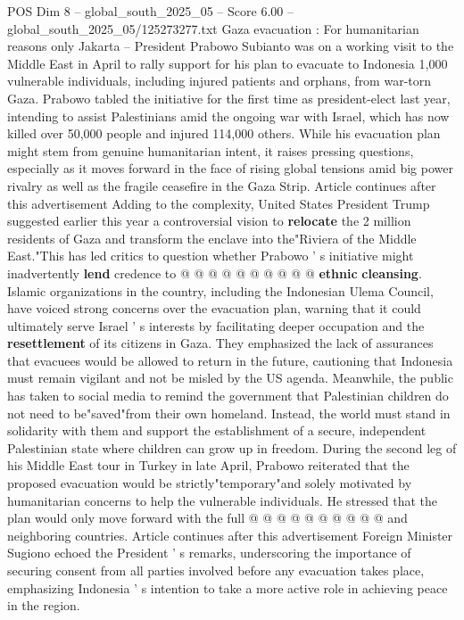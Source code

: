 \begin{textsample}{POS Dim 8 – global\_south\_2025\_05 – Score 6.00 – global\_south\_2025\_05/125273277.txt}  \label{ex:f8_pos_133}
Gaza evacuation : For humanitarian reasons only Jakarta -- President Prabowo Subianto was on a working visit to the Middle East in April to rally support for his plan to evacuate to Indonesia 1,000 vulnerable individuals, including injured patients and orphans, from war-torn Gaza.
Prabowo tabled the initiative for the first time as president-elect last year, intending to assist Palestinians amid the ongoing war with Israel, which has now killed over 50,000 people and injured 114,000 others.
While his evacuation plan might stem from genuine humanitarian intent, it raises pressing questions, especially as it moves forward in the face of rising global tensions amid big power rivalry as well as the fragile ceasefire in the Gaza Strip.
Article continues after this advertisement Adding to the complexity, United States President Trump suggested earlier this year a controversial vision to \textbf{relocate} the 2 million residents of Gaza and transform the enclave into the"Riviera of the Middle East."This has led critics to question whether Prabowo ' s initiative might inadvertently \textbf{lend} credence to @ @ @ @ @ @ @ @ @ @ \textbf{ethnic} \textbf{cleansing}.
Islamic organizations in the country, including the Indonesian Ulema Council, have voiced strong concerns over the evacuation plan, warning that it could ultimately serve Israel ' s interests by facilitating deeper occupation and the \textbf{resettlement} of its citizens in Gaza.
They emphasized the lack of assurances that evacuees would be allowed to return in the future, cautioning that Indonesia must remain vigilant and not be misled by the US agenda.
Meanwhile, the public has taken to social media to remind the government that Palestinian children do not need to be"saved"from their own homeland.
Instead, the world must stand in solidarity with them and support the establishment of a secure, independent Palestinian state where children can grow up in freedom.
During the second leg of his Middle East tour in Turkey in late April, Prabowo reiterated that the proposed evacuation would be strictly"temporary"and solely motivated by humanitarian concerns to help the vulnerable individuals.
He stressed that the plan would only move forward with the full @ @ @ @ @ @ @ @ @ @ and neighboring countries.
Article continues after this advertisement Foreign Minister Sugiono echoed the President ' s remarks, underscoring the importance of securing consent from all parties involved before any evacuation takes place, emphasizing Indonesia ' s intention to take a more active role in achieving peace in the region.

\end{textsample}
